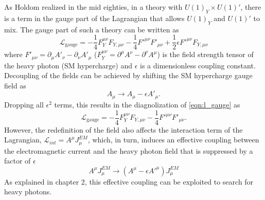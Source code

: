 As Holdom \cite{holdom1986} realized in the mid eighties, in a theory with 
$U(1)_Y \times U(1)'$, there is a term in the gauge part of the Lagrangian 
that allows $U(1)_Y$ and $U(1)'$ to mix.  The gauge part of such a theory can
be written as
\begin{equation}
    \mathcal{L}_{\text{gauge}} = - \frac{1}{4} F_Y^{\mu \nu}F_{Y, \mu \nu}
                          - \frac{1}{4} F'^{\mu \nu}F'_{\mu \nu}
                          + \frac{1}{2} \epsilon F'^{\mu \nu} F_{Y, \mu \nu}
    \label{eqn:l_gauge}
\end{equation}
where $F'_{\mu \nu} = \partial_{\mu}A'_{\nu} - \partial_{\nu}A'_{\mu}$ 
($F^{\mu \nu}_{Y} = \partial^{\mu}A^{\nu} - \partial^{\nu}A^{\mu}$) is the
field strength tensor of the heavy photon (SM hypercharge) and $\epsilon$ is a
dimensionless coupling constant.  Decoupling of the fields can be achieved by 
shifting the SM hypercharge gauge field as 
\begin{equation}
    A_{\mu} \rightarrow A_{\mu} - \epsilon A'_{\mu}.
\end{equation}
Dropping all $\epsilon^2$ terms, this results in the diagnolization of \ref{eqn:l_gauge} as
\begin{equation}
    \mathcal{L}_{\text{gauge}} = - \frac{1}{4} F_Y^{\mu \nu}F_{Y, \mu \nu}
                          - \frac{1}{4} F'^{\mu \nu}F'_{\mu \nu}.
\end{equation}
However, the redefinition of the field also affects the interaction term of 
the Lagrangian, $\mathcal{L}_{int} = A^{\mu}J_{\mu}^{EM}$, which, in turn, induces
an effective coupling between the electromagnetic current and the heavy photon
field that is suppressed by a factor of $\epsilon$
\begin{equation}
    A^{\mu}J_{\mu}^{EM} \rightarrow (A^{\mu} - \epsilon A'^{\mu})J_{\mu}^{EM}
\end{equation}
As explained in chapter 2, this effective coupling can be exploited to search for heavy 
photons.

